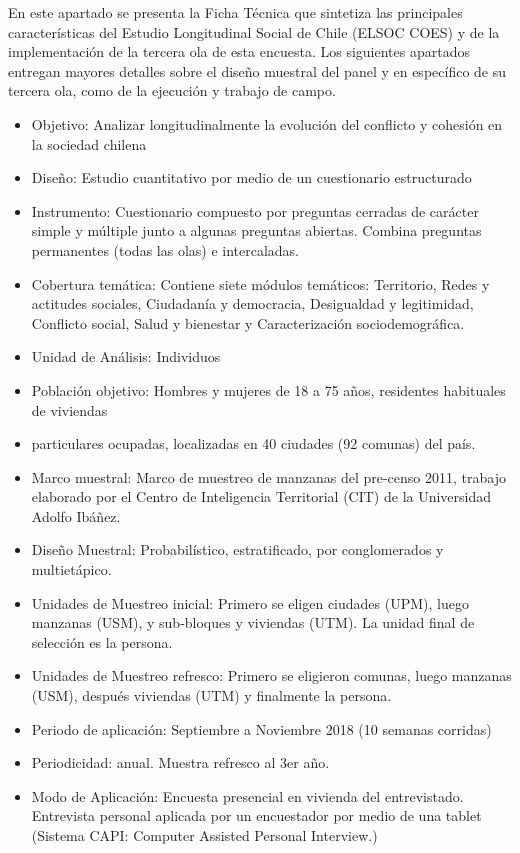 \documentclass[
  openany]{book}
\providecommand{\tightlist}{%
  \setlength{\itemsep}{0pt}\setlength{\parskip}{0pt}}
\begin{document}
En este apartado se presenta la Ficha Técnica que sintetiza las principales características del Estudio Longitudinal Social de Chile (ELSOC COES) y de la implementación de la tercera ola de esta encuesta. Los siguientes apartados entregan mayores detalles sobre el diseño muestral del panel y en específico de su tercera ola, como de la ejecución y trabajo de campo.

\begin{itemize}
\tightlist
\item
  Objetivo: Analizar longitudinalmente la evolución del conflicto y cohesión en la sociedad chilena
\item
  Diseño: Estudio cuantitativo por medio de un cuestionario estructurado
\item
  Instrumento: Cuestionario compuesto por preguntas cerradas de carácter simple y múltiple junto a algunas preguntas abiertas. Combina preguntas permanentes (todas las olas) e intercaladas.
\item
  Cobertura temática: Contiene siete módulos temáticos: Territorio, Redes y actitudes sociales, Ciudadanía y democracia, Desigualdad y legitimidad, Conflicto social, Salud y bienestar y Caracterización sociodemográfica.
\item
  Unidad de Análisis: Individuos
\item
  Población objetivo: Hombres y mujeres de 18 a 75 años, residentes habituales de viviendas
\item
  particulares ocupadas, localizadas en 40 ciudades (92 comunas) del país.
\item
  Marco muestral: Marco de muestreo de manzanas del pre-censo 2011, trabajo elaborado por el Centro de Inteligencia Territorial (CIT) de la Universidad Adolfo Ibáñez.
\item
  Diseño Muestral: Probabilístico, estratificado, por conglomerados y multietápico.
\item
  Unidades de Muestreo inicial: Primero se eligen ciudades (UPM), luego manzanas (USM), y sub-bloques y viviendas (UTM). La unidad final de selección es la persona.
\item
  Unidades de Muestreo refresco: Primero se eligieron comunas, luego manzanas (USM), después viviendas (UTM) y finalmente la persona.
\item
  Periodo de aplicación: Septiembre a Noviembre 2018 (10 semanas corridas)
\item
  Periodicidad: anual. Muestra refresco al 3er año.
\item
  Modo de Aplicación: Encuesta presencial en vivienda del entrevistado. Entrevista personal aplicada por un encuestador por medio de una tablet (Sistema CAPI: Computer Assisted Personal Interview.)

\end{itemize}
\end{document}
